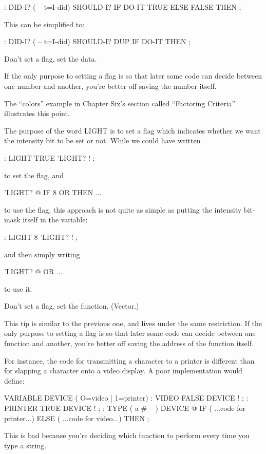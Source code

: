 \begin{Code}
: DID-I?  ( -- t=I-did)
   SHOULD-I?  IF  DO-IT  TRUE  ELSE  FALSE  THEN ;
\end{Code}
This can be simplified to:

\begin{Code}
: DID-I?  ( -- t=I-did)
        SHOULD-I? DUP  IF  DO-IT  THEN ;
\end{Code}
\begin{tip}
Don't set a flag, set the data.
\end{tip}
If the only purpose to setting a flag is so that later some code can decide
between one number and another, you're better off saving the number
itself.

The ``colors'' example in Chapter Six's section called ``Factoring
Criteria'' illustrates this point.

The purpose of the word LIGHT is to set a flag which indicates
whether we want the intensity bit to be set or not. While we could have
written

\begin{Code}
: LIGHT   TRUE 'LIGHT? ! ;
\end{Code}
to set the flag, and

\begin{Code}
'LIGHT? @ IF  8 OR  THEN ...
\end{Code}
to use the flag, this approach is not quite as simple as putting the
intensity bit-mask itself in the variable:

\begin{Code}
: LIGHT   8 'LIGHT? ! ;
\end{Code}
and then simply writing

\begin{Code}
'LIGHT? @  OR ...
\end{Code}
to use it.

\begin{tip}
Don't set a flag, set the function. (Vector.)
\end{tip}
This tip is similar to the previous one, and lives under the same
restriction. If the only purpose to setting a flag is so that later some
code can decide between one function and another, you're better off saving
the address of the function itself.

For instance, the code for transmitting a character to a printer is
different than for slapping a character onto a video display. A poor
implementation would define:

\begin{Code}
VARIABLE DEVICE  ( O=video | 1=printer)
: VIDEO   FALSE DEVICE ! ;
: PRINTER   TRUE DEVICE ! ;
: TYPE  ( a # -- ) DEVICE @ IF
   ( ...code for printer...) ELSE
   ( ...code for video...)  THEN ;
\end{Code}
This is bad because you're deciding which function to perform every time
you type a string.

